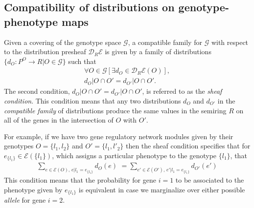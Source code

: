 \subsection*{Compatibility of distributions on genotype-phenotype maps}
Given a covering of the genotype space $\mathcal{G}$, a compatible family for $\mathcal{G}$ with respect to the distribution presheaf $\mathcal{D}_R\mathcal{E}$ is given by a family of distributions $\{d_O \colon P^O \rightarrow R | O \in \mathcal{G}\}$ such that
\begin{eqnarray*}
\forall O \in \mathcal{G} \left[ \exists d_O \in \mathcal{D}_R\mathcal{E}(O) \right],\\
d_O|O \cap O' = d_{O'}|O \cap O'.
\end{eqnarray*}
The second condition, $d_O|O \cap O' = d_{O'}|O \cap O'$, is referred to as the \emph{sheaf condition}. This condition means that any two distributions $d_O$ and $d_{O'}$ in the \emph{compatible family} of distributions produce the same values in the semiring $R$ on all of the genes in the intersection of $O$ with $O'$.

For example, if we have two gene regulatory network modules given by their genotypes $O = \{l_1, l_2\}$ and $O' = \{l_1, l'_2\}$ then the sheaf condition specifies that for $e_{\{l_1\}} \in \mathcal{E}(\{l_1\})$, which assigns a particular phenotype to the genotype $\{l_1\}$, that
\begin{eqnarray}\label{eq:sheafprob}
\sum_{e \in \mathcal{E}(O),\, e|l_1=e_{\{l_1\}}} d_O(e) \,\, = \sum_{e' \in \mathcal{E}(O'),\, e'|l_1=e_{\{l_1\}}} d_{O'}(e')
\end{eqnarray}
This condition means that the probability for gene $i=1$ to be associated to the phenotype given by $e_{\{l_1\}}$ is equivalent in case we marginalize over either possible \emph{allele} for gene $i=2$.

